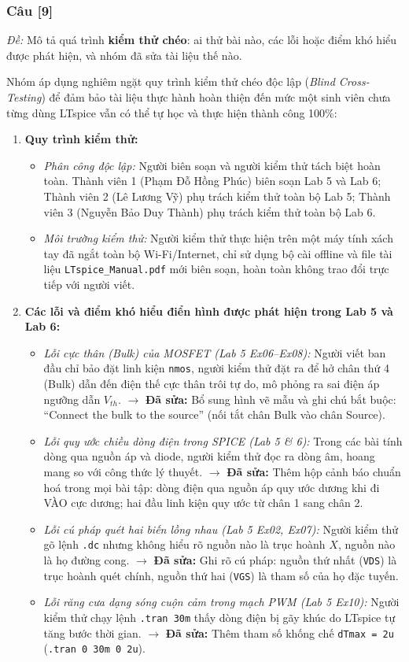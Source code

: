 \documentclass[12pt,a4paper]{article}
\newcommand{\TVa}{Phạm Đỗ Hồng Phúc}   \newcommand{\MSa}{2510359}   \newcommand{\PTa}{-- Lab 5, Lab 6}  %
\newcommand{\TVb}{Lê Lương Vỹ}          \newcommand{\MSb}{2214056}   \newcommand{\PTb}{-- Lab 1, Lab 2}  %
\newcommand{\TVc}{Nguyễn Bảo Duy Thành} \newcommand{\MSc}{2510372}   \newcommand{\PTc}{-- Lab 3, Lab 4}  %
\newcommand{\cauhoi}[2]{%
  \subsubsection{Câu [#1]}
  \begin{tcolorbox}[colback=white,colframe=guidegray!70,boxrule=0.4pt,arc=1pt,left=5pt,right=5pt,top=2pt,bottom=2pt]
  \small\textit{Đề:} #2
  \end{tcolorbox}
  \par\vspace{4pt}}
\begin{document}
\cauhoi{9}{Mô tả quá trình \textbf{kiểm thử chéo}: ai thử bài nào, các lỗi hoặc điểm khó hiểu được phát hiện, và nhóm đã sửa tài liệu thế nào.}

Nhóm áp dụng nghiêm ngặt quy trình kiểm thử chéo độc lập (\textit{Blind Cross-Testing}) để đảm bảo tài liệu thực hành hoàn thiện đến mức một sinh viên chưa từng dùng LTspice vẫn có thể tự học và thực hiện thành công 100\%:

\begin{enumerate}
  \item \textbf{Quy trình kiểm thử:}
  \begin{itemize}
    \item \textit{Phân công độc lập:} Người biên soạn và người kiểm thử tách biệt hoàn toàn. Thành viên 1 (\TVa) biên soạn Lab 5 và Lab 6; Thành viên 2 (\TVb) phụ trách kiểm thử toàn bộ Lab 5; Thành viên 3 (\TVc) phụ trách kiểm thử toàn bộ Lab 6.
    \item \textit{Môi trường kiểm thử:} Người kiểm thử thực hiện trên một máy tính xách tay đã ngắt toàn bộ Wi-Fi/Internet, chỉ sử dụng bộ cài offline và file tài liệu \texttt{LTspice\_Manual.pdf} mới biên soạn, hoàn toàn không trao đổi trực tiếp với người viết.
  \end{itemize}

  \item \textbf{Các lỗi và điểm khó hiểu điển hình được phát hiện trong Lab 5 và Lab 6:}
  \begin{itemize}
    \item \textit{Lỗi cực thân (Bulk) của MOSFET (Lab 5 Ex06--Ex08):} Người viết ban đầu chỉ bảo đặt linh kiện \texttt{nmos}, người kiểm thử đặt ra để hở chân thứ 4 (Bulk) dẫn đến điện thế cực thân trôi tự do, mô phỏng ra sai điện áp ngưỡng dẫn $V_{th}$. $\rightarrow$ \textbf{Đã sửa:} Bổ sung hình vẽ mẫu và ghi chú bắt buộc: ``Connect the bulk to the source'' (nối tắt chân Bulk vào chân Source).
    \item \textit{Lỗi quy ước chiều dòng điện trong SPICE (Lab 5 \& 6):} Trong các bài tính dòng qua nguồn áp và diode, người kiểm thử đọc ra dòng âm, hoang mang so với công thức lý thuyết. $\rightarrow$ \textbf{Đã sửa:} Thêm hộp cảnh báo chuẩn hoá trong mọi bài tập: dòng điện qua nguồn áp quy ước dương khi đi VÀO cực dương; hai đầu linh kiện quy ước từ chân 1 sang chân 2.
    \item \textit{Lỗi cú pháp quét hai biến lồng nhau (Lab 5 Ex02, Ex07):} Người kiểm thử gõ lệnh \texttt{.dc} nhưng không hiểu rõ nguồn nào là trục hoành $X$, nguồn nào là họ đường cong. $\rightarrow$ \textbf{Đã sửa:} Ghi rõ cú pháp: nguồn thứ nhất (\texttt{VDS}) là trục hoành quét chính, nguồn thứ hai (\texttt{VGS}) là tham số của họ đặc tuyến.
    \item \textit{Lỗi răng cưa dạng sóng cuộn cảm trong mạch PWM (Lab 5 Ex10):} Người kiểm thử chạy lệnh \texttt{.tran 30m} thấy dòng điện bị gãy khúc do LTspice tự tăng bước thời gian. $\rightarrow$ \textbf{Đã sửa:} Thêm tham số khống chế \texttt{dTmax = 2u} (\texttt{.tran 0 30m 0 2u}).
  \end{itemize}


\end{enumerate}
\end{document}

